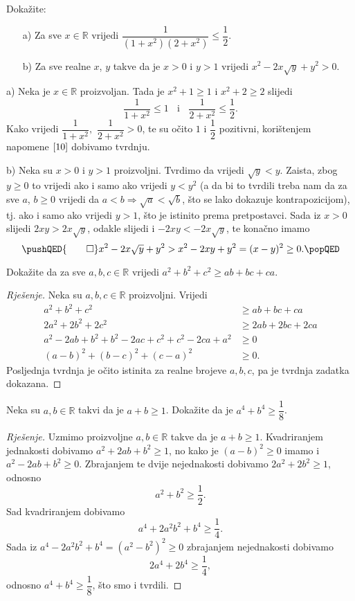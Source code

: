 \begin{exercise}
Dokažite:
\begin{itemize}
\item[a)] Za sve $x\in \mathbb{R}$ vrijedi $\dfrac{1}{(1+x^2)(2+x^2)}\leq \dfrac{1}{2}$.
\item[b)] Za sve realne $x$, $y$ takve da je $x>0$ i $y>1$ vrijedi $x^2-2x\sqrt{y}+y^2> 0$.
\end{itemize}
\end{exercise}
\begin{proof*}
a) Neka je $x\in \mathbb{R}$ proizvoljan. Tada je $x^2+1\geq 1$ i $x^2+2\geq 2$ slijedi $$\dfrac{1}{1+x^2}\leq 1 \;\; \text{ i }\;\;\dfrac{1}{2+x^2}\leq \dfrac{1}{2}.$$ Kako vrijedi $\dfrac{1}{1+x^2},$ $\dfrac{1}{2+x^2}>0$, te su očito $1$ i $\dfrac{1}{2}$ pozitivni, korištenjem napomene $\ref{10}$ dobivamo tvrdnju.

b) Neka su $x>0$ i $y>1$ proizvoljni. Tvrdimo da vrijedi $\sqrt{y}< y$. Zaista, zbog $y\geq 0$ to vrijedi ako i samo ako vrijedi $y<y^2$ (a da bi to tvrdili treba nam da za sve $a$, $b\geq 0$ vrijedi da $a<b\Rightarrow \sqrt{a}<\sqrt{b}$, što se lako dokazuje kontrapozicijom), tj. ako i samo ako vrijedi $y>1$, što je istinito prema pretpostavci. Sada iz $x>0$ slijedi $2xy>2x\sqrt{y}$, odakle slijedi i $-2xy<-2x\sqrt{y}$, te konačno imamo
\[
\pushQED{\qed}
x^2-2x\sqrt{y}+y^2>x^2-2xy+y^2=(x-y)^2\geq 0.\qedhere
\popQED
\]
\end{proof*}
\begin{exercise}
Dokažite da za sve $a, b, c\in \mathbb{R}$ vrijedi $a^2+b^2+c^2\geq ab+bc+ca$.
\end{exercise}
\begin{proof}[Rješenje]
Neka su $a, b, c\in \mathbb{R}$ proizvoljni. Vrijedi
\begin{align*}
a^2+b^2+c^2&\geq ab+bc+ca\\
2a^2+2b^2+2c^2&\geq 2ab+2bc+2ca\\
a^2-2ab+b^2+b^2-2ac+c^2+c^2-2ca+a^2&\geq 0\\
(a-b)^2+(b-c)^2+(c-a)^2&\geq 0.
\end{align*}
Posljednja tvrdnja je očito istinita za realne brojeve $a, b, c$, pa je tvrdnja zadatka dokazana.
\end{proof}
\begin{exercise}
Neka su $a, b\in \mathbb{R}$ takvi da je $a+b\geq 1$. Dokažite da je $a^4+b^4\geq \dfrac{1}{8}$.
\end{exercise}
\begin{proof}[Rješenje]
Uzmimo proizvoljne $a, b\in \mathbb{R}$ takve da je $a+b\geq 1$. Kvadriranjem jednakosti dobivamo $a^2+2ab+b^2\geq 1$, no kako je $(a-b)^2\geq 0$ imamo i $a^2-2ab+b^2\geq 0$. Zbrajanjem te dvije nejednakosti dobivamo $2a^2+2b^2\geq 1$, odnosno $$a^2+b^2\geq \dfrac{1}{2}.$$ Sad kvadriranjem dobivamo $$a^4+2a^2b^2+b^4\geq \dfrac{1}{4}.$$ Sada iz $a^4-2a^2b^2+b^4=(a^2-b^2)^2\geq 0$ zbrajanjem nejednakosti dobivamo $$2a^4+2b^4\geq \dfrac{1}{4},$$ odnosno $a^4+b^4\geq \dfrac{1}{8}$, što smo i tvrdili.
\end{proof}
